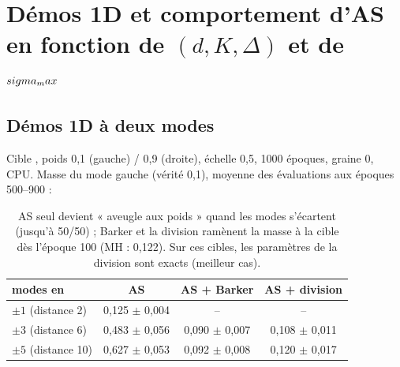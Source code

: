 \section{Démos 1D et comportement d'AS en fonction de $(d,K,\Delta)$ et de $sigma_max$}
\label{sec:dk}

\subsection{Démos 1D à deux modes}
Cible , poids 0,1 (gauche) / 0,9 (droite), échelle 0,5, 1000 époques, graine 0, CPU. Masse du mode gauche (vérité 0,1), moyenne des évaluations aux époques 500--900 :
\begin{table}[h]\centering\small
\begin{tabular}{lccc}\toprule
modes en & AS & AS + Barker & AS + division\\\midrule
$\pm1$ (distance 2) & 0,125 $\pm$ 0,004 & -- & --\\
$\pm3$ (distance 6) & 0,483 $\pm$ 0,056 & 0,090 $\pm$ 0,007 & 0,108 $\pm$ 0,011\\
$\pm5$ (distance 10) & 0,627 $\pm$ 0,053 & 0,092 $\pm$ 0,008 & 0,120 $\pm$ 0,017\\\bottomrule
\end{tabular}
\caption{AS seul devient « aveugle aux poids » quand les modes s'écartent (jusqu'à 50/50) ; Barker et la division ramènent la masse à la cible dès l'époque 100 (MH : 0,122). Sur ces cibles, les paramètres de la division sont exacts (meilleur cas).}
\end{table}

